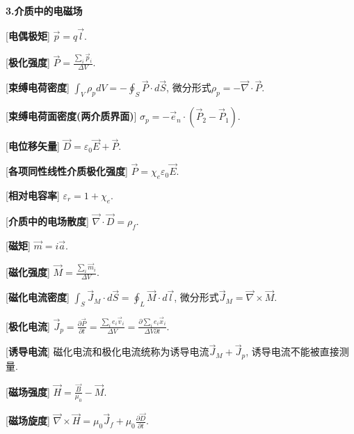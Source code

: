 \begin{center}
 \textbf{3.介质中的电磁场}
\end{center}

[\textbf{电偶极矩}] $\vec p=q\vec l$.\par

[\textbf{极化强度}] $\vec P=\frac{\sum\limits_i \vec p_i}{\Delta V}$.\par

[\textbf{束缚电荷密度}] $\int_V\rho_pdV=-\oint_S\vec P\cdot d\vec S$, 微分形式$\rho_p=-\vec\nabla\cdot\vec P$.\par

[\textbf{束缚电荷面密度(两介质界面)}] $\sigma_p=-\vec e_n\cdot (\vec P_2-\vec P_1)$.\par

[\textbf{电位移矢量}] $\vec D=\varepsilon_0\vec E+\vec P$.\par

[\textbf{各项同性线性介质极化强度}] $\vec P=\chi_e\varepsilon_0\vec E$.\par

[\textbf{相对电容率}] $\varepsilon_r=1+\chi_e$.\par

[\textbf{介质中的电场散度}] $\vec\nabla\cdot\vec D=\rho_f$.\par

[\textbf{磁矩}] $\vec m=i\vec a$.\par

[\textbf{磁化强度}] $\vec M=\frac{\sum\limits_i\vec m_i}{\Delta V}$.\par

[\textbf{磁化电流密度}] $\int_S\vec J_M\cdot d\vec S=\oint_L\vec M\cdot d\vec l$, 微分形式$\vec J_M=\vec\nabla\times\vec M$.\par

[\textbf{极化电流}] $\vec J_p=\frac{\partial \vec P}{\partial t}=\frac{\sum\limits_ie_i\vec v_i}{\Delta V}=\frac{\partial \sum\limits_i e_i\vec x_i}{\Delta V\partial t}$.\par

[\textbf{诱导电流}] 磁化电流和极化电流统称为诱导电流$\vec J_M+\vec J_p$, 诱导电流不能被直接测量.\par

[\textbf{磁场强度}] $\vec H=\frac{\vec B}{\mu_0}-\vec M$.\par

\clearpage

[\textbf{磁场旋度}] $\vec\nabla\times\vec H=\mu_0\vec J_f+\mu_0\frac{\partial \vec D}{\partial t}$.\par

